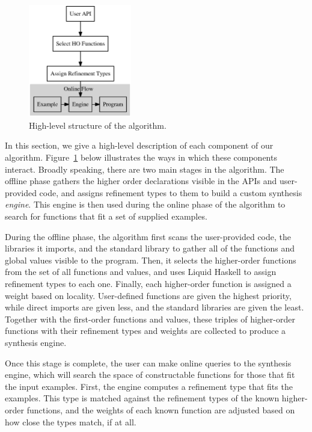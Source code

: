 

\begin{figure}[t]
  \centering
  \includegraphics[width=0.4\textwidth]{algo}
  \caption{High-level structure of the algorithm.}
  \label{fig:high_level_overview}
\end{figure}

In this section, we give a high-level description of each component of our algorithm. Figure~\ref{fig:high_level_overview} below illustrates the ways in which these components interact. Broadly speaking, there are two main stages in the algorithm. The offline phase gathers the higher order declarations visible in the APIs and user-provided code, and assigns refinement types to them to build a custom synthesis \textit{engine}. This engine is then used during the online phase of the algorithm to search for functions that fit a set of supplied examples.

During the offline phase, the algorithm first scans the user-provided code, the libraries it imports, and the standard library to gather all of the functions and global values visible to the program. Then, it selects the higher-order functions from the set of all functions and values, and uses Liquid Haskell \cite{liquidhaskell} to assign refinement types to each one. Finally, each higher-order function is assigned a weight based on locality. User-defined functions are given the highest priority, while direct imports are given less, and the standard libraries are given the least. Together with the first-order functions and values, these triples of higher-order functions with their refinement types and weights are collected to produce a synthesis engine.

Once this stage is complete, the user can make online queries to the synthesis engine, which will search the space of constructable functions for those that fit the input examples. First, the engine computes a refinement type that fits the examples. This type is matched against the refinement types of the known higher-order functions, and the weights of each known function are adjusted based on how close the types match, if at all.

